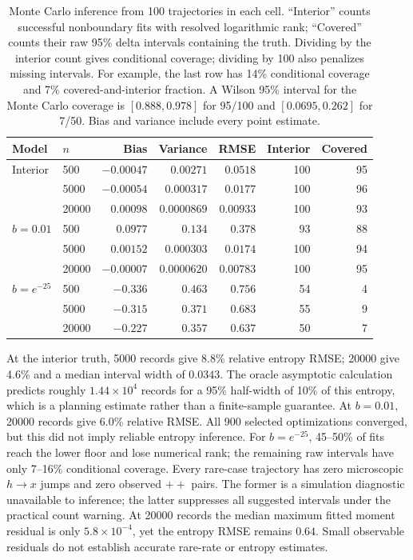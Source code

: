 \begin{table}[t]
\centering
\small
\begin{tabular}{llrrrrr}
\toprule
Model & $n$ & Bias & Variance & RMSE & Interior & Covered\\
\midrule
Interior & 500 & $-0.00047$ & $0.00271$ & $0.0518$ & 100 & 95\\
 & 5000 & $-0.00054$ & $0.000317$ & $0.0177$ & 100 & 96\\
 & 20000 & $0.00098$ & $0.0000869$ & $0.00933$ & 100 & 93\\
$b=0.01$ & 500 & $0.0977$ & $0.134$ & $0.378$ & 93 & 88\\
 & 5000 & $0.00152$ & $0.000303$ & $0.0174$ & 100 & 94\\
 & 20000 & $-0.00007$ & $0.0000620$ & $0.00783$ & 100 & 95\\
$b=e^{-25}$ & 500 & $-0.336$ & $0.463$ & $0.756$ & 54 & 4\\
 & 5000 & $-0.315$ & $0.371$ & $0.683$ & 55 & 9\\
 & 20000 & $-0.227$ & $0.357$ & $0.637$ & 50 & 7\\
\bottomrule
\end{tabular}
\caption{Monte Carlo inference from 100 trajectories in each cell. ``Interior''
counts successful nonboundary fits with resolved logarithmic rank; ``Covered''
counts their raw 95\% delta intervals containing the truth. Dividing by the
interior count gives conditional coverage; dividing by 100 also penalizes
missing intervals. For example, the last row has 14\% conditional coverage
and 7\% covered-and-interior fraction. A Wilson 95\% interval for the Monte
Carlo coverage is $[0.888,0.978]$ for 95/100 and $[0.0695,0.262]$ for 7/50.
Bias and variance include every point estimate.}\label{tab:finite-data}
\end{table}

At the interior truth, 5000 records give 8.8\% relative entropy RMSE; 20000
give 4.6\% and a median interval width of $0.0343$. The oracle asymptotic
calculation predicts roughly $1.44\times10^4$ records for a 95\% half-width
of 10\% of this entropy, which is a planning estimate rather than a
finite-sample guarantee. At $b=0.01$, 20000 records give 6.0\% relative RMSE.
All 900 selected optimizations converged, but this did not imply reliable
entropy inference. For $b=e^{-25}$, 45--50\% of fits reach the lower floor
and lose numerical rank; the remaining raw intervals have only 7--16\%
conditional coverage. Every rare-case trajectory has zero microscopic
$h\to x$ jumps and zero observed $++$ pairs. The former is a simulation
diagnostic unavailable to inference; the latter suppresses all suggested
intervals under the practical count warning. At 20000 records the median
maximum fitted moment residual is only $5.8\times10^{-4}$, yet the entropy
RMSE remains $0.64$. Small observable residuals do not establish accurate
rare-rate or entropy estimates.

